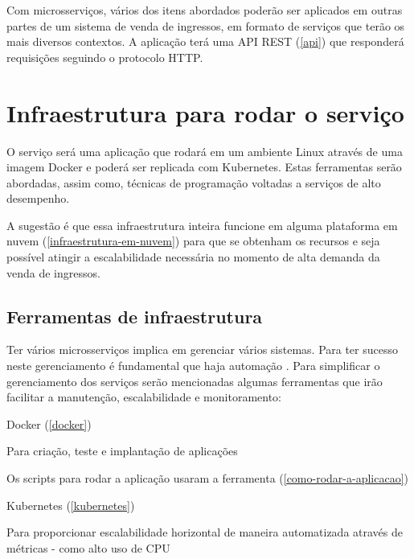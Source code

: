 Com microsserviços, vários dos itens abordados poderão ser aplicados em outras partes
de um sistema
de venda de ingressos, em formato de serviços que terão os mais diversos contextos.
A aplicação terá uma API REST (\autoref{api}) que responderá requisições
seguindo o protocolo HTTP.

\section{Infraestrutura para rodar o serviço}

O serviço será uma aplicação que rodará em um ambiente Linux através
de uma imagem Docker e poderá ser replicada com Kubernetes.
Estas ferramentas serão abordadas, assim como, técnicas de programação
voltadas a serviços de alto desempenho.

A sugestão é que essa infraestrutura inteira funcione em alguma plataforma em nuvem
(\autoref{infraestrutura-em-nuvem}) para que se obtenham os recursos e seja possível atingir
a escalabilidade necessária no momento de alta demanda da venda de ingressos.

\subsection{Ferramentas de infraestrutura}

Ter vários microsserviços implica em gerenciar
vários sistemas.
Para ter sucesso neste gerenciamento é fundamental que haja automação
\cite{martin-fowler-microservices}.
Para simplificar o gerenciamento dos serviços serão mencionadas algumas ferramentas que
irão facilitar a manutenção, escalabilidade e monitoramento:

\begin{alineas}

  \item Docker (\autoref{docker})

  \begin{alineas}
     \item Para criação, teste e implantação de aplicações \cite{aws-o-que-e-o-docker}
     \item Os scripts para rodar a aplicação usaram a ferramenta
           (\autoref{como-rodar-a-aplicacao})
  \end{alineas}

  \item Kubernetes (\autoref{kubernetes})

  \begin{alineas}
     \item Para proporcionar escalabilidade horizontal de maneira automatizada através de métricas
           - como alto uso de CPU \cite{kubernetes-horizontal-pod-autoscaling}
  \end{alineas}

\end{alineas}
